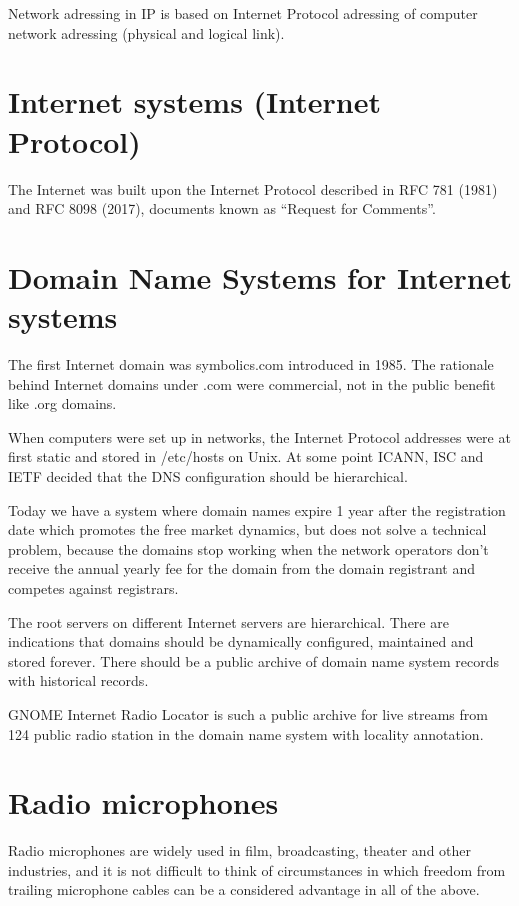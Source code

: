 \documentclass[a4paper,norsk,utf8]{report}
\begin{document}
    Network adressing in IP is based on Internet Protocol adressing
    of computer network adressing (physical and logical link).

\chapter{Internet systems (Internet Protocol)}

    The Internet was built upon the Internet Protocol described in RFC
    781 (1981) and RFC 8098 (2017), documents known as ``Request for
    Comments''.

\chapter{Domain Name Systems for Internet systems}

    The first Internet domain was symbolics.com introduced in 1985.
    The rationale behind Internet domains under .com were commercial,
    not in the public benefit like .org domains.

    When computers were set up in networks, the Internet Protocol
    addresses were at first static and stored in /etc/hosts on Unix.
    At some point ICANN, ISC and IETF decided that the DNS configuration
    should be hierarchical.

    Today we have a system where domain names expire 1 year after
    the registration date which promotes the free market dynamics,
    but does not solve a technical problem, because the domains stop
    working when the network operators don't receive the annual yearly
    fee for the domain from the domain registrant and competes against
    registrars.

    The root servers on different Internet servers are hierarchical.
    There are indications that domains should be dynamically
    configured, maintained and stored forever.  There should be
    a public archive of domain name system records with historical
    records.

    GNOME Internet Radio Locator is such a public archive for live
    streams from 124 public radio station in the domain name system
    with locality annotation.

\chapter{Radio microphones}

    Radio microphones are widely used in film, broadcasting, theater
    and other industries, and it is not difficult to think of
    circumstances in which freedom from trailing microphone cables can
    be a considered advantage in all of the above.
\end{document}
